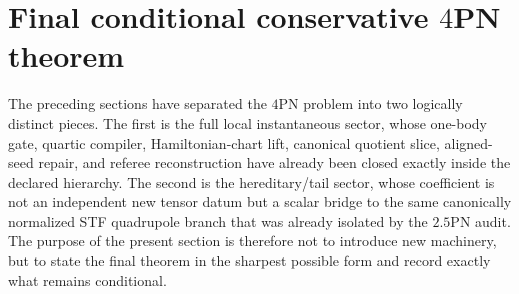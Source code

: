 \documentclass[11pt]{article}
\begin{document}
\section{Final conditional conservative \texorpdfstring{$4$}{4}PN theorem}
\label{sec:final-conditional-4pn-theorem}

The preceding sections have separated the $4$PN problem into two logically distinct
pieces.  The first is the full local instantaneous sector, whose one-body gate,
quartic compiler, Hamiltonian-chart lift, canonical quotient slice, aligned-seed
repair, and referee reconstruction have already been closed exactly inside the
declared hierarchy.  The second is the hereditary/tail sector, whose coefficient
is not an independent new tensor datum but a scalar bridge to the same
canonically normalized STF quadrupole branch that was already isolated by the
$2.5$PN audit.  The purpose of the present section is therefore not to introduce
new machinery, but to state the final theorem in the sharpest possible form and
record exactly what remains conditional.
\end{document}
